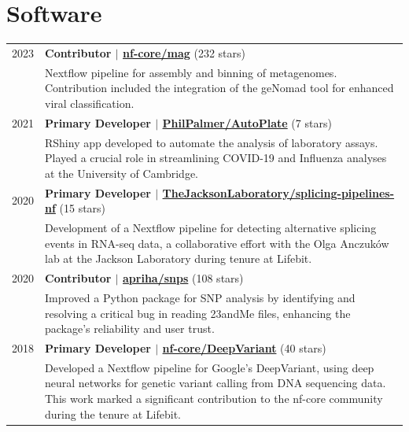 \documentclass[letterpaper,11pt]{article}
\begin{document}
\section{\textbf{Software}}
\vspace{3pt}
\begin{tabularx}{\linewidth}{@{}p{2cm}@{\hspace{5pt}}|@{\hspace{5pt}}X@{}}
    2023 & 
    \textbf{Contributor $|$ \href{https://github.com/nf-core/mag}{\color{teal}nf-core/mag}} (232 stars) \\
    & Nextflow pipeline for assembly and binning of metagenomes. Contribution included the integration of the geNomad tool for enhanced viral classification. \\
    2021 &
    \textbf{Primary Developer $|$ \href{https://github.com/PhilPalmer/AutoPlate}{\color{teal}PhilPalmer/AutoPlate}} (7 stars) \\
    & RShiny app developed to automate the analysis of laboratory assays. Played a crucial role in streamlining COVID-19 and Influenza analyses at the University of Cambridge. \\
    2020 &
    \textbf{Primary Developer $|$ \href{https://github.com/TheJacksonLaboratory/splicing-pipelines-nf}{\color{teal}TheJacksonLaboratory/splicing-pipelines-nf}} (15 stars) \\
    & Development of a Nextflow pipeline for detecting alternative splicing events in RNA-seq data, a collaborative effort with the Olga Anczuków lab at the Jackson Laboratory during tenure at Lifebit. \\
    2020 &
    \textbf{Contributor $|$ \href{https://github.com/apriha/snps}{\color{teal}apriha/snps}} (108 stars) \\
    & Improved a Python package for SNP analysis by identifying and resolving a critical bug in reading 23andMe files, enhancing the package's reliability and user trust. \\
    2018 &
    \textbf{Primary Developer $|$ \href{https://github.com/nf-core/DeepVariant}{\color{teal}nf-core/DeepVariant}} (40 stars) \\
    & Developed a Nextflow pipeline for Google's DeepVariant, using deep neural networks for genetic variant calling from DNA sequencing data. This work marked a significant contribution to the nf-core community during the tenure at Lifebit. \\    
\end{tabularx}
\end{document}
